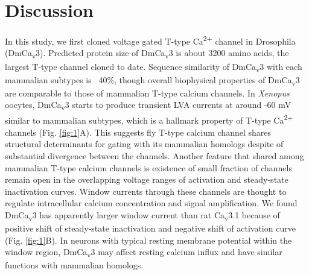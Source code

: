 \section*{Discussion}

In this study, we first cloned voltage gated T-type Ca\textsuperscript{2+} channel in Drosophila (DmCa\textsubscript{v}3).
Predicted protein size of DmCa\textsubscript{v}3 is about 3200 amino acids, the largest T-type channel cloned to date\cite{senatore:2010aa}.
Sequence similarity of DmCa\textsubscript{v}3 with each mammalian subtypes is ~40\%, though overall biophysical properties of DmCa\textsubscript{v}3 are comparable to those of mammalian T-type calcium channels.
In \emph{Xenopus} oocytes, DmCa\textsubscript{v}3 starts to produce transient LVA currents at around -60 mV similar to mammalian subtypes, which is a hallmark property of T-type Ca\textsuperscript{2+} channels\cite{PerezReyes:2003bw} (Fig. \ref{fig:1}A).
This suggests fly T-type calcium channel shares structural determinants for gating with its mammalian homologs despite of substantial divergence between the channels.
Another feature that shared among mammalian T-type calcium channels is existence of small fraction of channels remain open in the overlapping voltage ranges of activation and steady-state inactivation curves.
Window currents through these channels are thought to regulate intracellular calcium concentration and signal amplification\cite{PerezReyes:2003bw,crunelli:2004aa,dreyfus:2010aa}.
We found DmCa\textsubscript{v}3 has apparently larger window current than rat Ca\textsubscript{v}3.1 because of positive shift of steady-state inactivation and negative shift of activation curve (Fig. \ref{fig:1}B).
In neurons with typical resting membrane potential within the window region, DmCa\textsubscript{v}3 may affect resting calcium influx and have similar functions with mammalian homologs.

